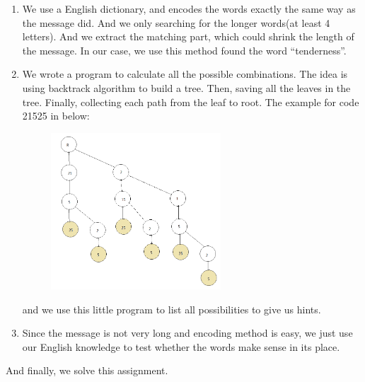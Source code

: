\documentclass[12pt]{article} %
\begin{document}
\renewcommand\labelenumi{\arabic{enumi}.}
\begin{enumerate}
\item We use a English dictionary, and encodes the words exactly the same way as the message did. And we only searching for the longer words(at least 4 letters). And we extract the matching part, which could shrink the length of the message. In our case, we use this method found the word ``tenderness''.

\item We wrote a program to calculate all the possible combinations. The idea is using backtrack algorithm to build a tree. Then, saving all the leaves in the tree. Finally, collecting each path from the leaf to root. The example for code 21525 in below: 

\pagebreak

\begin{figure}[h]
\centering
\includegraphics[width=0.6\textwidth]{tree.png}
\end{figure}

and we use this little program to list all possibilities to give us hints.

\item Since the message is not very long and encoding method is easy, we just use our English knowledge to test whether the words make sense in its place.

\end{enumerate}

And finally, we solve this assignment.

\pagebreak
\end{document}
